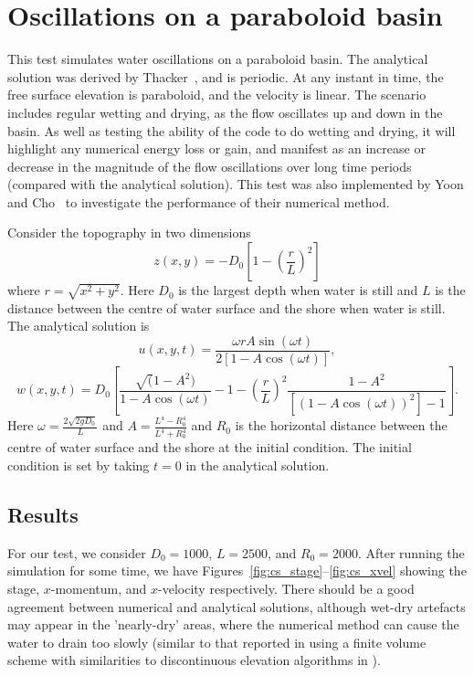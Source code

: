 \section{Oscillations on a paraboloid basin}
This test simulates water oscillations on a paraboloid basin. The analytical solution was derived by Thacker~\cite{Thacker1981}, and is periodic. At any instant in time, the free surface elevation is paraboloid, and the velocity is linear. The scenario includes regular wetting and drying, as the flow oscillates up and down in the basin. As well as testing the ability of the code to do wetting and drying, it will highlight any numerical energy loss or gain, and manifest as an increase or decrease in the magnitude of the flow oscillations over long time periods (compared with the analytical solution). This test was also implemented by Yoon and Cho~\cite{YC2001} to investigate the performance of their numerical method.

Consider the topography in two dimensions
\begin{equation}
z(x,y) = -D_0\left[1 -\left(\frac{r}{L}\right)^2\right]
\end{equation}
where $r=\sqrt{x^2 + y^2}$. Here $D_0$ is the largest depth when water is still and $L$ is the distance between the centre of water surface and the shore when water is still.
The analytical solution is 
\begin{equation}
u(x,y,t) = \frac{\omega r A \sin{(\omega t)}}{ 2 \left[1 -A \cos(\omega t)\right] },
\end{equation}
\begin{equation}
w(x,y,t) = D_0 \left[\frac{\sqrt(1-A^2)}{1-A\cos(\omega t)}  -1 
-\left( \frac{r}{L}\right)^2 \frac{1-A^2}{[(1-A\cos(\omega t))^2]-1} \right].
\end{equation}
Here $\omega=\frac{2\sqrt{2 g D_0}}{L}$ and $A = \frac{L^4 - R_0^4}{L^4 + R_0^4}$ and $R_0$ is the horizontal distance between the centre of water surface and the shore at the initial condition.
The initial condition is set by taking $t=0$ in the analytical solution.

\subsection{Results}
For our test, we consider $D_0=1000$, $L=2500$, and $R_0=2000$.
After running the simulation for some time, we have Figures~\ref{fig:cs_stage}--\ref{fig:cs_xvel} showing the stage, $x$-momentum, and $x$-velocity respectively. There should be a good agreement between numerical and analytical solutions, although wet-dry artefacts may appear in the 'nearly-dry' areas, where the numerical method can cause the water to drain too slowly (similar to that reported in \cite{KESSERWANIA14} using a finite volume scheme with similarities to discontinuous elevation algorithms in \anuga{}).

